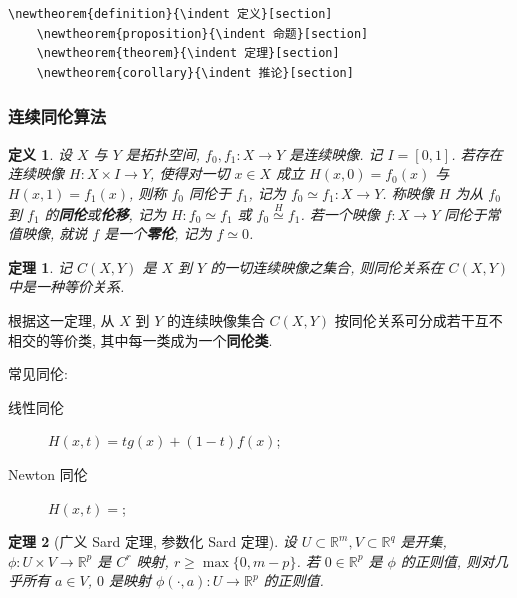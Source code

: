 \documentclass[12]{ctexart}
\begin{document}
\begin{lstlisting}[language=Tex, caption={Newtheorem example}, label={newtheorem_demo}]
    \newtheorem{definition}{\indent 定义}[section]
    \newtheorem{proposition}{\indent 命题}[section]
    \newtheorem{theorem}{\indent 定理}[section]
    \newtheorem{corollary}{\indent 推论}[section]
\end{lstlisting}

\subsubsection{连续同伦算法}

\newtheorem{definition}{\indent 定义}[section]
\newtheorem{proposition}{\indent 命题}[section]
\newtheorem{theorem}{\indent 定理}[section]
\newtheorem{corollary}{\indent 推论}[section]

\begin{definition}
  设 \(X\) 与 \(Y\) 是拓扑空间, \(f_0,f_1:X\to Y\) 是连续映像. 记 \(I=[0,1]\). 若存在连续映像 \(H:X\times I\to Y\), 使得对一切 \(x\in X\) 成立 \(H(x,0)=f_0(x)\) 与 \(H(x,1)=f_1(x)\), 则称 \(f_0\) 同伦于 \(f_1\), 记为 \(f_0\simeq f_1:X\to Y\). 称映像 \(H\) 为从 \(f_0\) 到 \(f_1\) 的\textbf{同伦}或\textbf{伦移}, 记为 \(H:f_0\simeq f_1\) 或 \(f_0 \overset{H}{\simeq} f_1\). 若一个映像 \(f:X\to Y\) 同伦于常值映像, 就说 \(f\) 是一个\textbf{零伦}, 记为 \(f\simeq 0\).
\end{definition}

\begin{theorem}
  记 \(C(X,Y)\) 是 \(X\) 到 \(Y\) 的一切连续映像之集合, 则同伦关系在 \(C(X,Y)\) 中是一种等价关系.
\end{theorem}

根据这一定理, 从 \(X\) 到 \(Y\) 的连续映像集合 \(C(X,Y)\) 按同伦关系可分成若干互不相交的等价类, 其中每一类成为一个\textbf{同伦类}.

常见同伦:
\begin{description}
  \item[线性同伦] \(H(x,t)=tg(x)+(1-t)f(x)\);
  \item[Newton 同伦] \(H(x,t)=\);
\end{description}

\begin{theorem}[广义 Sard 定理, 参数化 Sard 定理]
设 \(U\subset\mathbb{R}^m,V\subset\mathbb{R}^q\) 是开集, \(\phi:U\times V\to\mathbb{R}^p\) 是 \(C^r\) 映射, \(r\ge\max\lbrace 0,m-p\rbrace\). 若 \(0\in\mathbb{R}^p\) 是 \(\phi\) 的正则值, 则对几乎所有 \(a\in V\), \(0\) 是映射 \(\phi(\cdot,a):U\to\mathbb{R}^p\) 的正则值.
\end{theorem}
\end{document}
